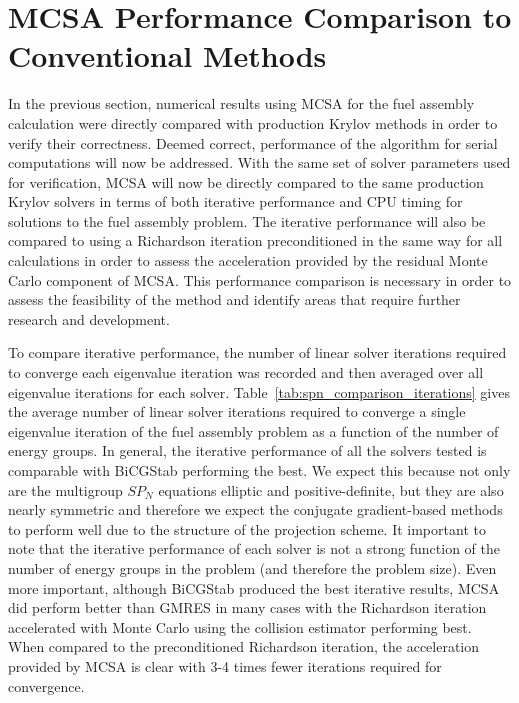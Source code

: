 \clearpage 

\section{MCSA Performance Comparison to Conventional Methods\ }
\label{sec:spn_comparison}
In the previous section, numerical results using MCSA for the fuel
assembly calculation were directly compared with production Krylov
methods in order to verify their correctness. Deemed correct,
performance of the algorithm for serial computations will now be
addressed. With the same set of solver parameters used for
verification, MCSA will now be directly compared to the same
production Krylov solvers in terms of both iterative performance and
CPU timing for solutions to the fuel assembly problem. The iterative
performance will also be compared to using a Richardson iteration
preconditioned in the same way for all calculations in order to assess
the acceleration provided by the residual Monte Carlo component of
MCSA. This performance comparison is necessary in order to assess the
feasibility of the method and identify areas that require further
research and development.

To compare iterative performance, the number of linear solver
iterations required to converge each eigenvalue iteration was recorded
and then averaged over all eigenvalue iterations for each
solver. Table~\ref{tab:spn_comparison_iterations} gives the average
number of linear solver iterations required to converge a single
eigenvalue iteration of the fuel assembly problem as a function of the
number of energy groups. In general, the iterative performance of all
the solvers tested is comparable with BiCGStab performing the best. We
expect this because not only are the multigroup $SP_N$ equations
elliptic and positive-definite, but they are also nearly symmetric and
therefore we expect the conjugate gradient-based methods to perform
well due to the structure of the projection scheme. It important to
note that the iterative performance of each solver is not a strong
function of the number of energy groups in the problem (and therefore
the problem size). Even more important, although BiCGStab produced the
best iterative results, MCSA did perform better than GMRES in many
cases with the Richardson iteration accelerated with Monte Carlo using
the collision estimator performing best. When compared to the
preconditioned Richardson iteration, the acceleration provided by MCSA
is clear with 3-4 times fewer iterations required for convergence.

